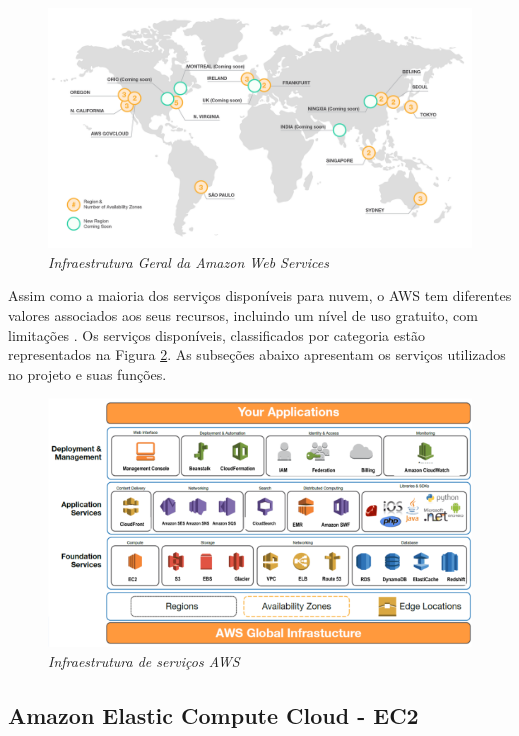 \documentclass[tg]{mdtufsm}
\begin{document}
\begin{figure}
	\centering
	\includegraphics[width=1\textwidth]{aws-infrastructure}
	\caption{\emph{Infraestrutura Geral da Amazon Web Services \cite{awsinfra}}}
	\label{fig:awsInfra}
\end{figure}

Assim como a maioria dos serviços disponíveis para nuvem, o AWS tem diferentes valores associados aos seus recursos, incluindo um nível de uso gratuito, com limitações \cite{ec2price}. Os serviços disponíveis, classificados por categoria estão representados na Figura \ref{fig:awsArq}. As subseções abaixo apresentam os serviços utilizados no projeto e suas funções.

\begin{figure}
	\centering
	\includegraphics[width=1\textwidth]{aws-arq}
	\caption{\emph{Infraestrutura de serviços AWS \cite{awsarq}}}
	\label{fig:awsArq}
\end{figure}

\subsection{Amazon Elastic Compute Cloud - EC2}
\end{document}

